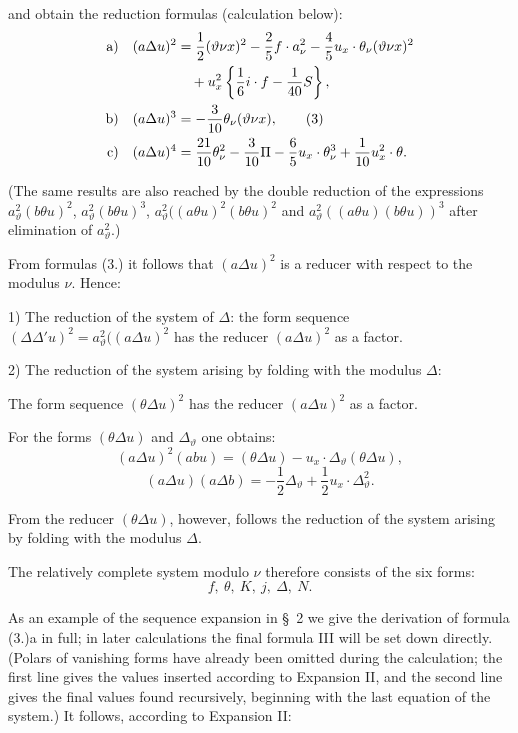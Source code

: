 \documentclass[11pt]{article}
\newcommand{\A}{\Delta}
\begin{document}
and obtain the reduction formulas (calculation below):
\begin{align}
\text{a)}\quad (a\A u)^2
&=\frac12(\vartheta\nu x)^2-\frac25 f\cdot a_\nu^2
-\frac45u_x\cdot\theta_\nu(\vartheta\nu x)^2 \notag\\
&\quad+u_x^2\left\{\frac16 i\cdot f-\frac1{40}S\right\},\notag\\
\text{b)}\quad (a\A u)^3
&=-\frac3{10}\theta_\nu(\vartheta\nu x),\tag{3}\\
\text{c)}\quad (a\A u)^4
&=\frac{21}{10}\theta_\nu^2-\frac3{10}\Pi
-\frac65u_x\cdot\theta_\nu^3+\frac1{10}u_x^2\cdot\theta .\notag
\end{align}

(The same results are also reached by the double reduction of the expressions $a_\vartheta^2(b\theta u)^2$, $a_\vartheta^2(b\theta u)^3$, $a_\vartheta^2((a\theta u)^2(b\theta u)^2$ and $a_\vartheta^2((a\theta u)(b\theta u))^3$ after elimination of $a_\vartheta^2$.)

From formulas (3.) it follows that $(a\A u)^2$ is a reducer with respect to the modulus $\nu$. Hence:

1) The reduction of the system of $\A$: the form sequence $(\A\A' u)^2=a_\vartheta^2((a\A u)^2$ has the reducer $(a\A u)^2$ as a factor.

2) The reduction of the system arising by folding with the modulus $\A$:

The form sequence $(\theta\A u)^2$ has the reducer $(a\A u)^2$ as a factor.

For the forms $(\theta\A u)$ and $\A_\vartheta$ one obtains:
\[
(a\A u)^2(abu)=(\theta\A u)-u_x\cdot\A_\vartheta(\theta\A u),
\]
\[
(a\A u)(a\A b)=-\frac12\A_\vartheta+\frac12u_x\cdot\A_\vartheta^2.
\]

From the reducer $(\theta\A u)$, however, follows the reduction of the system arising by folding with the modulus $\A$.

\bigskip


The relatively complete system modulo $\nu$ therefore consists of the six forms:
\[
f,\ \theta,\ K,\ j,\ \A,\ N.
\]

As an example of the sequence expansion in \S\ 2 we give the derivation of formula (3.)a in full; in later calculations the final formula III will be set down directly. (Polars of vanishing forms have already been omitted during the calculation; the first line gives the values inserted according to Expansion II, and the second line gives the final values found recursively, beginning with the last equation of the system.) It follows, according to Expansion II:
\end{document}
